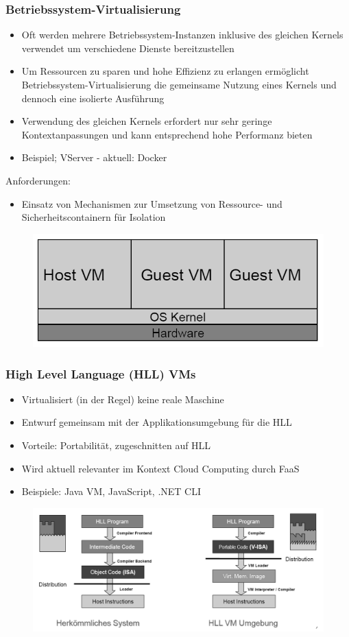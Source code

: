 \documentclass[a4paper,10pt]{scrreprt}
\begin{document}
	\subsubsection{Betriebssystem-Virtualisierung}
	\begin{itemize}
		\item Oft werden mehrere Betriebssystem-Instanzen inklusive des gleichen Kernels verwendet um verschiedene Dienste bereitzustellen
		\item Um Ressourcen zu sparen und hohe Effizienz zu erlangen ermöglicht Betriebssystem-Virtualisierung die gemeinsame Nutzung eines Kernels und dennoch eine isolierte Ausführung
		\item Verwendung des gleichen Kernels erfordert nur sehr geringe Kontextanpassungen und kann entsprechend hohe Performanz bieten
		\item Beispiel; VServer - aktuell: Docker
	\end{itemize}
	Anforderungen:
	\begin{itemize}
		\item Einsatz von Mechanismen zur Umsetzung von Ressource- und Sicherheitscontainern für Isolation
	\end{itemize}
	\begin{figure}[ht]
		\centering
		\includegraphics[width=.6\textwidth]{images/betriebssystem}
	\end{figure}
\newpage
	\subsubsection{High Level Language (HLL) VMs}
	\begin{itemize}
		\item Virtualisiert (in der Regel) keine reale Maschine
		\item Entwurf gemeinsam mit der Applikationsumgebung für die HLL
		\item Vorteile: Portabilität, zugeschnitten auf HLL
		\item Wird aktuell relevanter im Kontext Cloud Computing durch FaaS
		\item Beispiele: Java VM, JavaScript, .NET CLI
	\end{itemize}
	\begin{figure}[ht]
		\centering
		\includegraphics[width=1\textwidth]{images/hll}
	\end{figure}
\end{document}
